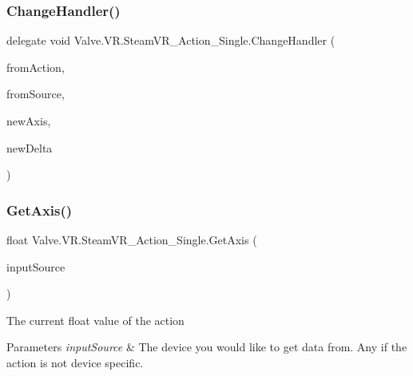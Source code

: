 \mbox{\label{class_valve_1_1_v_r_1_1_steam_v_r___action___single_ae0c72c83dccd88a0235e8a831d62116e}} 
\subsubsection{\texorpdfstring{ChangeHandler()}{ChangeHandler()}}
{\footnotesize\ttfamily delegate void Valve.\+V\+R.\+Steam\+V\+R\+\_\+\+Action\+\_\+\+Single.\+Change\+Handler (\begin{DoxyParamCaption}\item[{\mbox{\hyperlink{class_valve_1_1_v_r_1_1_steam_v_r___action___single}{Steam\+V\+R\+\_\+\+Action\+\_\+\+Single}}}]{from\+Action,  }\item[{\mbox{\hyperlink{namespace_valve_1_1_v_r_a82e5bf501cc3aa155444ee3f0662853f}{Steam\+V\+R\+\_\+\+Input\+\_\+\+Sources}}}]{from\+Source,  }\item[{float}]{new\+Axis,  }\item[{float}]{new\+Delta }\end{DoxyParamCaption})}

\mbox{\label{class_valve_1_1_v_r_1_1_steam_v_r___action___single_a3b78812c9a7bea43b8d64440d5f4b339}} 
\subsubsection{\texorpdfstring{GetAxis()}{GetAxis()}}
{\footnotesize\ttfamily float Valve.\+V\+R.\+Steam\+V\+R\+\_\+\+Action\+\_\+\+Single.\+Get\+Axis (\begin{DoxyParamCaption}\item[{\mbox{\hyperlink{namespace_valve_1_1_v_r_a82e5bf501cc3aa155444ee3f0662853f}{Steam\+V\+R\+\_\+\+Input\+\_\+\+Sources}}}]{input\+Source }\end{DoxyParamCaption})}



The current float value of the action 


\begin{DoxyParams}{Parameters}
{\em input\+Source} & The device you would like to get data from. Any if the action is not device specific.\\
\hline
\end{DoxyParams}


